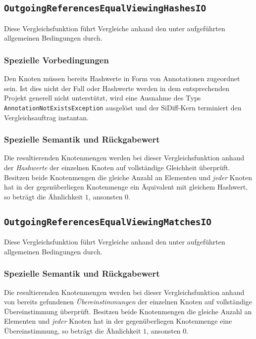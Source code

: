 \subsection{\texttt{OutgoingReferencesEqualViewingHashesIO}}
Diese Vergleichsfunktion führt Vergleiche anhand den unter\mylinebreak{} aufgeführten allgemeinen Bedingungen durch.

\subsubsection*{Spezielle Vorbedingungen}
Den Knoten müssen bereits Hashwerte in Form von Annotationen zugeordnet sein. Ist dies nicht der Fall oder Hashwerte werden in dem entsprechenden Projekt generell nicht unterstützt, wird eine Ausnahme des Typs \texttt{AnnotationNotExistsException} ausgelöst und der SiDiff-Kern terminiert den Vergleichsauftrag instantan.

\subsubsection*{Spezielle Semantik und Rückgabewert}
Die resultierenden Knotenmengen werden bei dieser Vergleichsfunktion anhand der \emph{Hashwerte} der einzelnen Knoten auf vollständige Gleichheit überprüft. Besitzen beide Knotenmengen die gleiche Anzahl an Elementen und \emph{jeder} Knoten hat in der gegenüberliegen Knotenmenge ein Äquivalent mit gleichem Hashwert, so beträgt die Ähnlichkeit $1$, ansonsten $0$.


%
%
\subsection{\texttt{OutgoingReferencesEqualViewingMatchesIO}}
Diese Vergleichsfunktion führt Vergleiche anhand den unter\mylinebreak{} aufgeführten allgemeinen Bedingungen durch.

\subsubsection*{Spezielle Semantik und Rückgabewert}
Die resultierenden Knotenmengen werden bei dieser Vergleichsfunktion anhand von bereits gefundenen \emph{Übereinstimmungen} der einzelnen Knoten auf vollständige Übereinstimmung überprüft. Besitzen beide Knotenmengen die gleiche Anzahl an Elementen und \emph{jeder} Knoten hat in der gegenüberliegen Knotenmenge eine Übereinstimmung, so beträgt die Ähnlichkeit $1$, ansonsten $0$.

